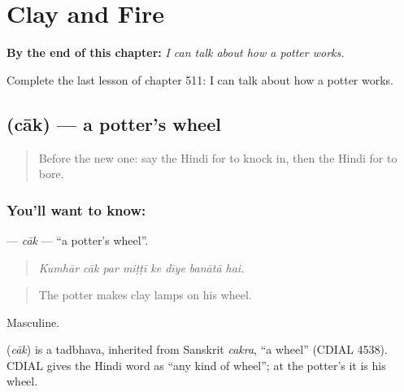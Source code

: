 
\chapter{Clay and Fire}
\label{ch:hi-clay-and-fire}

\begin{chapteropening}
\textbf{By the end of this chapter:} \emph{I can talk about how a potter works.}

Complete the last lesson of chapter 511: I can talk about how a potter works.
\end{chapteropening}

\section[\texorpdfstring{\hi{चाक} (cāk)}{चाक (cāk)}]{ (cāk) — a potter's wheel}

\label{lesson:HI-C511-cak}



\begin{quote}
Before the new one: say the Hindi for to knock in, then the Hindi for to bore.
\end{quote}

\subsection*{You'll want to know: }
\textbf{} — \emph{cāk} — \textquotedblleft{}a potter's wheel\textquotedblright{}.

\begin{quote}
       
\end{quote}

\begin{quote}
\emph{Kumhār cāk par miṭṭī ke dīye banātā hai.}
\end{quote}

\begin{quote}
The potter makes clay lamps on his wheel.
\end{quote}

Masculine.

\begin{cousinweb}
\textbf{} (\emph{cāk}) is a tadbhava, inherited from Sanskrit \emph{cakra}, \textquotedblleft{}a wheel\textquotedblright{} (CDIAL 4538). CDIAL gives the Hindi word as \textquotedblleft{}any kind of wheel\textquotedblright{}; at the potter's it is his wheel.
\end{cousinweb}

